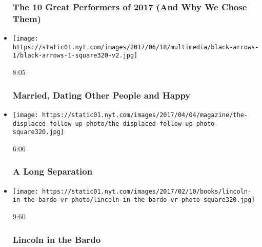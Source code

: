 \begin{itemize}
  \hypertarget{the-10-great-performers-of-2017-and-why-we-chose-them}{%
  \subsubsection{The 10 Great Performers of 2017 (And Why We Chose
  Them)}\label{the-10-great-performers-of-2017-and-why-we-chose-them}}
\item
  \href{https://www.nytimes.com/video/magazine/100000005087630/open-marriages-non-monogamy.html?action=click\&module=video-series-bar\&region=header\&pgtype=Article\&playlistId=video/magazine}{}

  \texttt{[image: https://static01.nyt.com/images/2017/06/18/multimedia/black-arrows-1/black-arrows-1-square320-v2.jpg]}

  8:05

  \hypertarget{married-dating-other-people-and-happy}{%
  \subsubsection{Married, Dating Other People and
  Happy}\label{married-dating-other-people-and-happy}}
\item
  \href{https://www.nytimes.com/video/magazine/100000005013826/lynsey-addario-south-sudan-refugee.html?action=click\&module=video-series-bar\&region=header\&pgtype=Article\&playlistId=video/magazine}{}

  \texttt{[image: https://static01.nyt.com/images/2017/04/04/magazine/the-displaced-follow-up-photo/the-displaced-follow-up-photo-square320.jpg]}

  6:06

  \hypertarget{a-long-separation}{%
  \subsubsection{A Long Separation}\label{a-long-separation}}
\item
  \href{https://www.nytimes.com/video/magazine/100000004919906/lincoln-in-the-bardo.html?action=click\&module=video-series-bar\&region=header\&pgtype=Article\&playlistId=video/magazine}{}

  \texttt{[image: https://static01.nyt.com/images/2017/02/10/books/lincoln-in-the-bardo-vr-photo/lincoln-in-the-bardo-vr-photo-square320.jpg]}

  9:60

  \hypertarget{lincoln-in-the-bardo}{%
  \subsubsection{Lincoln in the Bardo}\label{lincoln-in-the-bardo}}
\end{itemize}

